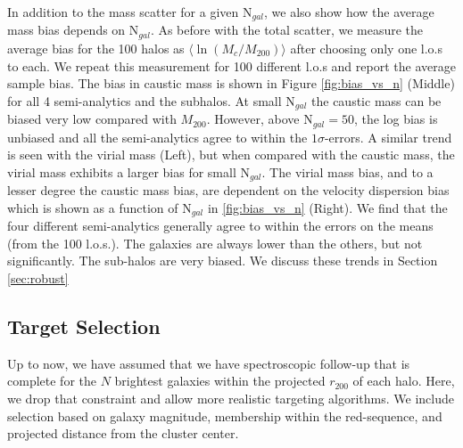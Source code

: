 \documentclass[iop]{emulateapj}
\begin{document}
In addition to the mass scatter for a given N$_{gal}$, we also show how the average mass bias depends on N$_{gal}$. As before with the total scatter, we measure the average bias for the 100 halos as $\langle \ln (M_{c}/M_{200}) \rangle$ after choosing only one l.o.s to each. We repeat this measurement for 100 different l.o.s and report the average sample bias. The bias in caustic mass is shown in Figure \ref{fig:bias_vs_n} (Middle) for all 4 semi-analytics and the subhalos. At small N$_{gal}$ the caustic mass can be biased very low compared with $M_{200}$. However, above N$_{gal} = 50$, the log bias is unbiased and all the semi-analytics agree to within the $1\sigma$-errors. A similar trend is seen with the virial mass (Left), but when compared with the caustic mass, the virial mass exhibits a larger bias for small N$_{gal}$. The virial mass bias, and to a lesser degree the caustic mass bias, are dependent on the velocity dispersion bias which is shown as a function of N$_{gal}$ in \ref{fig:bias_vs_n} (Right). We find that the four different semi-analytics generally agree to within the errors on the means (from the 100 l.o.s.). The \citet{Bower06} galaxies are always lower than the others, but not significantly. The sub-halos are very biased. We discuss these trends in Section \ref{sec:robust}

\begin{figure*}
\caption{The bias in virial mass {\bf Left}, caustic mass {\bf Middle}, and velocity dispersion {\bf Right} as a function of the number of galaxies (N$_{gal}$) used in the mass determination. The biases are shown for the Guo (red), De Lucia (orange), Bertone (green), and Bower (blue) semi-analytics as well as the subhalos (purple). N$_{gal}$ is the dominant source of bias in the caustic mass as well as the virial mass, and the semi-analytic biases all converge to within errors at high sampling.}
\label{fig:bias_vs_n}
\end{figure*}

\subsection{Target Selection}
\label{sec:results_target}
Up to now, we have assumed that we have spectroscopic follow-up that is complete for the $N$ brightest galaxies within the projected $r_{200}$ of each halo. Here, we drop that constraint and allow more realistic targeting algorithms. We include selection based on galaxy magnitude, membership within the red-sequence, and projected distance from the cluster center. 
\end{document}
